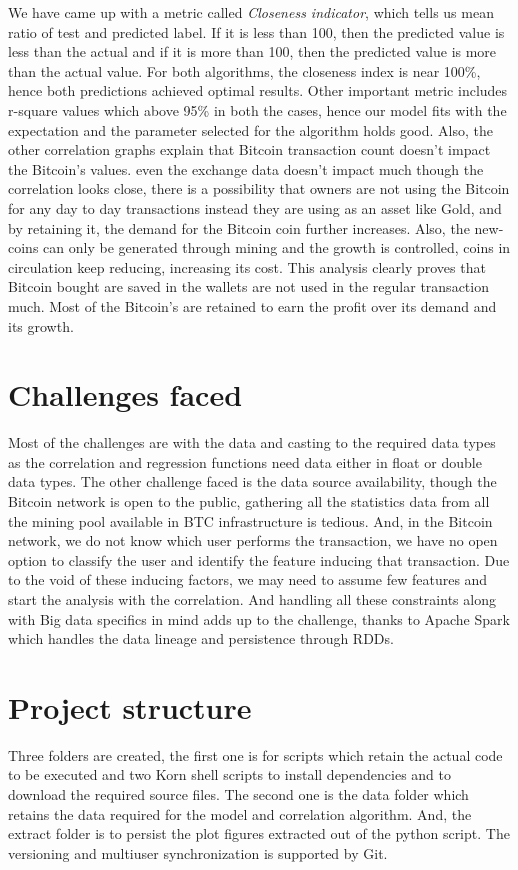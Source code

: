 \documentclass[sigconf]{acmart}
\begin{document}
We have came up with a metric called {\em Closeness indicator}, which tells us mean ratio of test and predicted label. If it is less than 100, then the predicted value is less than the actual and if it is more than 100, then the predicted value is more than the actual value.
For both algorithms, the closeness index is near 100\%, hence both predictions achieved optimal results. Other important metric includes r-square values which above 95\% in both the cases, hence our model fits with the expectation and the parameter selected for the algorithm holds good. 
Also, the other correlation graphs explain that Bitcoin transaction count doesn't impact the Bitcoin's values. even the exchange data doesn't impact much though the correlation looks close, there is a possibility that owners are not using the Bitcoin for any day to day transactions instead they are using as an asset like Gold, and by retaining it, the demand for the Bitcoin coin further increases. Also, the new-coins can only be generated through mining and the growth is controlled, coins in circulation keep reducing, increasing its cost.
This analysis clearly proves that Bitcoin bought are saved in the wallets are not used in the regular transaction much. Most of the Bitcoin's are retained to earn the profit over its demand and its growth.


\section{Challenges faced}
Most of the challenges are with the data and casting to the required data types as the correlation and regression functions need data either in float or double data types. The other challenge faced is the data source availability, though the Bitcoin network is open to the public, gathering all the statistics data from all the mining pool available in BTC infrastructure is tedious. And, in the Bitcoin network, we do not know which user performs the transaction, we have no open option to classify the user and identify the feature inducing that transaction. Due to the void of these inducing factors, we may need to assume few features and start the analysis with the correlation. And handling all these constraints along with Big data specifics in mind adds up to the challenge, thanks to Apache Spark which handles the data lineage and persistence through RDDs. 

\section{Project structure}
Three folders are created, the first one is for scripts which retain the actual code to be executed and two Korn shell scripts to install dependencies and to download the required source files. The second one is the data folder which retains the data required for the model and correlation algorithm. And, the extract folder is to persist the plot figures extracted out of the python script. The versioning and multiuser synchronization is supported by Git. 
\end{document}
